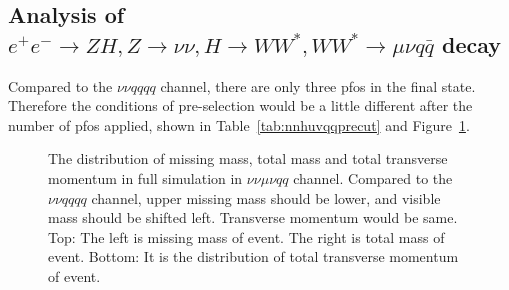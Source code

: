 \documentclass[11pt,a4paper]{cepcnote}
\begin{document}
\subsection{Analysis of $e^+e^-\rightarrow ZH, Z\rightarrow \nu\nu, H\rightarrow WW^*, WW^*\rightarrow \mu\nu q\bar{q}$ decay}
Compared to the $\nu\nu qqqq$ channel, there are only three pfos in the final state. Therefore the conditions of pre-selection 
would be a little different after the number of pfos applied, 
shown in Table~\ref{tab:nnhuvqqprecut} and Figure~\ref{fig:nnHuvqqfiltered}.
\begin{figure}[H]
	\centering
	\caption[]{The distribution of missing mass, total mass and total transverse momentum in full simulation 
		in $\nu\nu\mu\nu qq$ channel. Compared to the $\nu\nu qqqq$ channel, upper missing mass should be lower, 
		and visible mass should be shifted left. Transverse momentum would be same.
		Top: The left is missing mass of event. The right is total mass of event.
		Bottom: It is the distribution of total transverse momentum of event.}
	\label{fig:nnHuvqqfiltered}
\end{figure}
\end{document}

